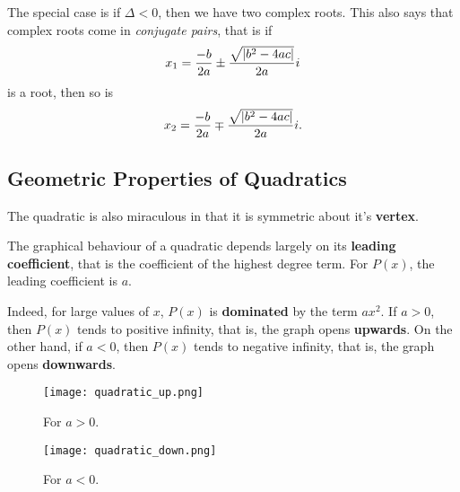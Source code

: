 \documentclass[../jarvis.tex]{subfiles}
\begin{document}
The special case is if $\Delta<0$, then we have two complex roots. This also says that complex roots come in \textit{conjugate pairs}, that is if
$$x_1=\frac{-b}{2a}\pm\frac{\sqrt{\left\lvert b^2-4ac \right\rvert}}{2a}i$$
is a root, then so is
$$x_2=\frac{-b}{2a}\mp\frac{\sqrt{\left\lvert b^2-4ac \right\rvert}}{2a}i.$$

\subsection{Geometric Properties of Quadratics}
The quadratic is also miraculous in that it is symmetric about it's \textbf{vertex}.

The graphical behaviour of a quadratic depends largely on its \textbf{leading coefficient}, that is the coefficient of the highest degree term. For $P(x)$, the leading coefficient is $a$.

Indeed, for large values of $x$, $P(x)$ is \textbf{dominated} by the term $ax^2$. If $a>0$, then $P(x)$ tends to positive infinity, that is, the graph opens \textbf{upwards}. On the other hand, if $a<0$, then $P(x)$ tends to negative infinity, that is, the graph opens \textbf{downwards}.

\begin{figure}
    \centering
    \begin{minipage}{.5\textwidth}
      \centering
      \texttt{[image: quadratic\_up.png]}
      \caption{For $a>0$.}
    \end{minipage}%
    \begin{minipage}{.5\textwidth}
      \centering
      \texttt{[image: quadratic\_down.png]}
      \caption{For $a<0$.}
    \end{minipage}
\end{figure}
\end{document}

